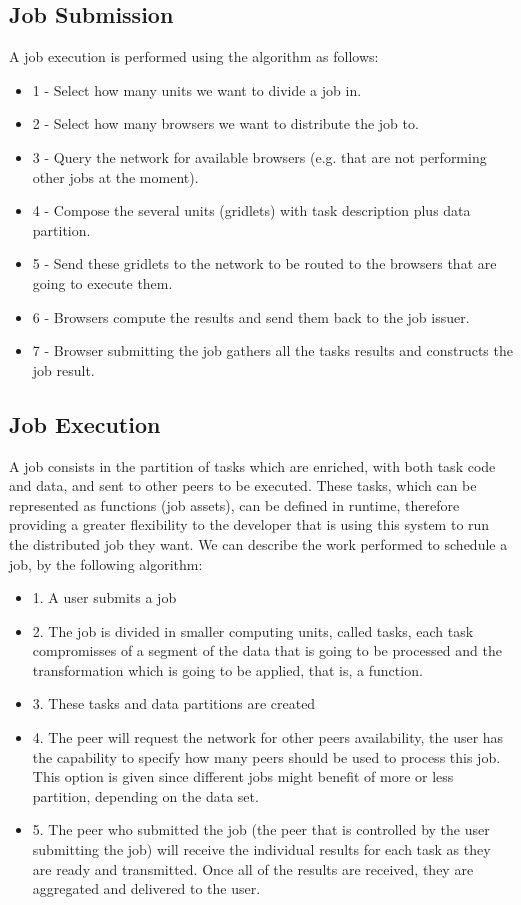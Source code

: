 \subsection{Job Submission}

A job execution is performed using the algorithm as follows:

\begin{itemize}
    \item 1 - Select how many units we want to divide a job in.
    \item 2 - Select how many browsers we want to distribute the job to.
    \item 3 - Query the network for available browsers (e.g. that are not performing other jobs at the moment).
    \item 4 - Compose the several units (gridlets) with task description plus data partition.
    \item 5 - Send these gridlets to the network to be routed to the browsers that are going to execute them.
    \item 6 - Browsers compute the results and send them back to the job issuer.
    \item 7 - Browser submitting the job gathers all the tasks results and constructs the job result.
\end{itemize}

\subsection{Job Execution}

A job consists in the partition of tasks which are enriched, with both task code and data, and sent to other peers to be executed. These tasks, which can be represented as functions (job assets), can be defined in runtime, therefore providing a greater flexibility to the developer that is using this system to run the distributed job they want. We can describe the work performed to schedule a job, by the following algorithm:

\begin{itemize}
    \item 1. A user submits a job
    \item 2. The job is divided in smaller computing units, called tasks, each task compromisses of a segment of the data that is going to be processed and the transformation which is going to be applied, that is, a function.
    \item 3. These tasks and data partitions are created
    \item 4. The peer will request the network for other peers availability, the user has the capability to specify how many peers should be used to process this job. This option is given since different jobs might benefit of more or less partition, depending on the data set.
    \item 5. The peer who submitted the job (the peer that is controlled by the user submitting the job) will receive the individual results for each task as they are ready and transmitted. Once all of the results are received, they are aggregated and delivered to the user.
\end{itemize}

